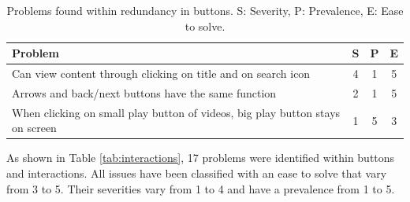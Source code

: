 \documentclass{sigchi}
\begin{document}
\begin{table}[H]
    \centering
    \begin{tabular}{|m{6.5cm}|c|c|c|}
    \hline
        \textbf{Problem} & \textbf{S} & \textbf{P} & \textbf{E}\\
    \hline
         Can view content through clicking on title and on search icon & 4 & 1 & 5\\
    \hline
         Arrows and back/next buttons have the same function & 2 & 1 & 5\\
    \hline
         When clicking on small play button of videos, big play button stays on screen & 1 & 5 & 3\\
    \hline
    \end{tabular}
    \caption{Problems found within redundancy in buttons. S: Severity, P: Prevalence, E: Ease to solve.}
    \label{tab:redundancy}
\end{table}

As shown in Table \ref{tab:interactions}, 17 problems were identified within buttons and interactions. All issues have been classified with an ease to solve that vary from 3 to 5. Their severities vary from 1 to 4 and have a prevalence from 1 to 5.
\end{document}
